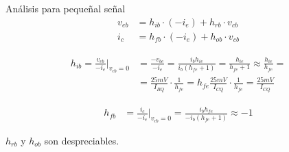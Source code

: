 \begin{frame}[allowframebreaks]{Análisis para pequeñal señal}
\begin{align*}
    v_{eb} &= h_{ib} \cdot (-i_e) + h_{rb} \cdot v_{cb} \\[6pt]
    i_c &= h_{fb} \cdot (-i_e) + h_{ob} \cdot v_{cb}
\end{align*}

\begin{align*}
    h_{ib} = \frac{v_{eb}}{-i_e} \bigg|_{v_{cb}=0} &= \frac{-v_{be}}{-i_e} = \frac{i_b h_{ie}}{i_b(h_{fe}+1)}=\frac{h_{ie}}{h_{fe}+1} \approx \frac{h_{ie}}{h_{fe}} =\\[6pt]
    &= \frac{25mV}{I_{BQ}} \cdot \frac{1}{h_{fe}} = h_{fe} \frac{25mV}{I_{CQ}} \cdot \frac{1}{h_{fe}} = \frac{25mV}{I_{CQ}}
\end{align*}

\begin{align*}
     h_{fb} &= \frac{i_c}{-i_e} \bigg|_{v_{cb}=0} = \frac{i_{b}h_{fe}}{-i_b({h_{fe}+1})} \approx -1
\end{align*}

$h_{rb}$ y $h_{ob}$ son despreciables.
\end{frame}


